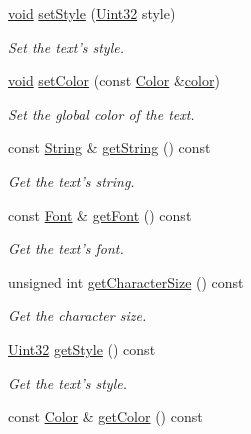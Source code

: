 \begin{DoxyCompactItemize}
\hyperlink{glutf90_8h_ac778d6f63f1aaf8ebda0ce6ac821b56e}{void} \hyperlink{classsf_1_1_text_ad791702bc2d1b6590a1719aa60635edf}{set\-Style} (\hyperlink{namespacesf_aa746fb1ddef4410bddf198ebb27e727c}{Uint32} style)
\begin{DoxyCompactList}\small\item\em Set the text's style. \end{DoxyCompactList}\item 
\hyperlink{glutf90_8h_ac778d6f63f1aaf8ebda0ce6ac821b56e}{void} \hyperlink{classsf_1_1_text_afd1742fca1adb6b0ea98357250ffb634}{set\-Color} (const \hyperlink{classsf_1_1_color}{Color} \&\hyperlink{gl3_8h_a3ea846f998d64f079b86052b6c4193a8}{color})
\begin{DoxyCompactList}\small\item\em Set the global color of the text. \end{DoxyCompactList}\item 
const \hyperlink{classsf_1_1_string}{String} \& \hyperlink{classsf_1_1_text_a14d580e8afdd43c210429505310ecc95}{get\-String} () const 
\begin{DoxyCompactList}\small\item\em Get the text's string. \end{DoxyCompactList}\item 
const \hyperlink{classsf_1_1_font}{Font} \& \hyperlink{classsf_1_1_text_a6f9c34aec007f14b2227dd6efff0c5c9}{get\-Font} () const 
\begin{DoxyCompactList}\small\item\em Get the text's font. \end{DoxyCompactList}\item 
unsigned int \hyperlink{classsf_1_1_text_a9abb85c6966c9879f6ba4d6e47be1dd5}{get\-Character\-Size} () const 
\begin{DoxyCompactList}\small\item\em Get the character size. \end{DoxyCompactList}\item 
\hyperlink{namespacesf_aa746fb1ddef4410bddf198ebb27e727c}{Uint32} \hyperlink{classsf_1_1_text_a3f7483a48faf66378da19d36ff6145cf}{get\-Style} () const 
\begin{DoxyCompactList}\small\item\em Get the text's style. \end{DoxyCompactList}\item 
const \hyperlink{classsf_1_1_color}{Color} \& \hyperlink{classsf_1_1_text_ae42818342a74a9d04644e2fbbd4ca29a}{get\-Color} () const 

\end{DoxyCompactItemize}
